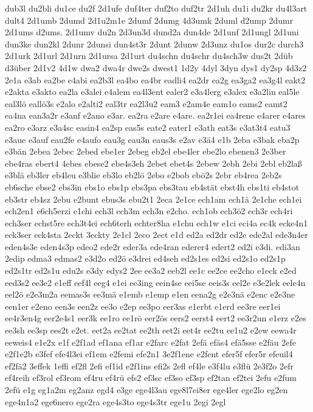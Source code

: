 {dub3l
du2bli
du1ce
du2f
2d1ufe
duf4ter
duf2to
duf2tr
2d1uh
du1i
du2kr
du4l3art
dult4
2d1umb
2dumd
2d1u2m1e
2dumf
2dumg
4d3umk
2duml
d2ump
2dumr
2d1ums
d2ums.
2d1umv
du2n
2d3un3d
dund2a
dun4de
2d1unf
2d1ungl
2d1uni
dun3ke
dun2kl
2dunr
2dunsi
dun4st3r
2dunt
2dunw
2d3unz
du1os
dur2c
durch3
2d1urk
2d1url
2d1urn
2d1ursa
2d1urt
du4schn
du4schr
du4sch3w
dus2t
2düb
d3über
2d1v2
4d1w
dwa2
dwa4r
dwe2s
dwest1
1d2y
4dyl
3dyn
dys1
dy2sp
4d3z2
2e1a
e3ab
ea2be
e4abi
ea2b3l
ea4bo
ea4br
eadli4
ea2dr
ea2g
ea3ga2
ea3g4l
eakt2
e2akta
e3akto
ea2la
e3alei
e4alem
ea4l3ent
ealer2
e3a4lerg
e3alex
e3a2lin
eal5le
eal3lö
eallö3s
e2alo
e2alti2
eal3tr
ea2l3u2
eam3
e2am4e
eam1o
eams2
eamt2
ea4na
ean3a2r
e3anf
e2ano
e3ar.
ea2ra
e2are
e4are.
ea2r1ei
ea4rene
e4arer
e4ares
ea2ro
e3arz
e3a4sc
easin4
ea2sp
eas5s
eate2
eater1
e3ath
eat3s
e3at3t4
eatu3
e3aue
e3auf
eau2fe
e4aufo
eau3g
eau3n
eaus3s
e2av
e3ä4
e1b
2eba
e3bak
eba2p
e3bän
2ebea
2ebec
2ebed
ebe1er
2ebeg
eb2el
ebe4ler
ebe2lo
ebenen3
2e3ber
ebe4ras
ebert4
4ebes
ebese2
ebe4s3eh
2ebet
ebet4s
2ebew
2ebh
2ebi
2ebl
eb2laß
e3blä
eb3ler
eb4leu
e3blie
eb3lo
eb2lö
2ebo
e2bob
ebö2s
2ebr
eb4rea
2eb2s
eb6sche
ebse2
ebs3in
ebs1o
ebs1p
ebs3pa
ebs3tau
eb4stät
ebst4h
ebs1ti
eb4stot
eb3str
eb4sz
2ebu
e2bunt
ebus3s
ebu2t1
2eca
2e1ce
ech1am
ech1ä
2e1che
ech1ei
ech2en1
e6ch5erzi
e1chi
ech3l
ech3m
ech3n
e2cho.
ech1ob
ech3ö2
ech3r
ech4ri
ech3ser
echst5re
ech3t4ei
ech6terh
echter8ha
e1chu
ech1w
e1ci
eci4a
ec4k
ecke4n1
eck3ser
eck4sta
2eckt
3eckty
2e1cl
2eco
2ect
e1d
ed2a
ed2dr
ed2e
ede2al
ede3n4er
eden4s3e
eden4s3p
edeo2
ede2r
eder3a
ede4ran
ederer4
edert2
ed2i
e3di.
edi3an
2edip
edma3
edmas2
e3d2o
ed2ö
e3drei
ed4seh
ed2s1es
ed2si
ed2s1o
ed2s1p
ed2s1tr
ed2s1u
edu2s
e3dy
edys2
2ee
ee3a2
eeb2l
ee1c
ee2ce
ee2cho
e1eck
e2ed
eed3s2
ee3e2
e1eff
eef4l
eeg4
e1ei
ee3ing
eein4se
eei5se
eeis3s
eel2e
e3e2lek
eele4n
eel2ö
e2e3m2a
eemas3s
ee3mä
e1emb
e1emp
e1en
eena2g
e2e3nä
e2enc
e2e3ne
een1er
e2eno
een3s
een2z
ee3o
e2ep
ee3po
eer3as
e1erbt
e1erd
ee3re
eer1ei
ee4r3en4g
eer2e4s1
eer3k
ee1ro
ee1rö
eer2ös
eers2
eerst4
eert2
ee3r2un
e1erz
e2es
ee3sh
ee3sp
ees2t
e2et.
eet2a
ee2tat
ee2th
eet2i
eet4r
ee2tu
ee1u2
e2ew
eewa4r
eeweis4
e1e2x
e1f
e2f1ad
ef1ana
ef1ar
e2farc
e2fat
2efä
efäs4
efä5sse
e2fäu
2efe
e2f1e2b
e3fef
efe4l3ei
ef1em
e2femi
efe2n1
3e2f1ene
e2fent
efer5f
efer5r
efeuil4
ef2fä2
3effek
1effi
ef2fl
2efi
ef1id
e2f1ins
efi2s
2efl
ef4le
e3f4lu
e3flü
2e3f2o
2efr
ef4reih
ef3rol
ef3rom
ef4ru
ef4rü
efs2
ef3sc
ef3so
ef3sp
ef2tan
ef2tei
2efu
e2fum
2efü
e1g
eg1a2m
eg2anz
egd4
e3ge
ege4l3au
ege8l7ei8er
ege4ler
ege2lo
eg2en
ege4n1a2
ege6nero
ege2ra
ege4s3to
ege4s3tr
ege1u
2egi
2egl
}
